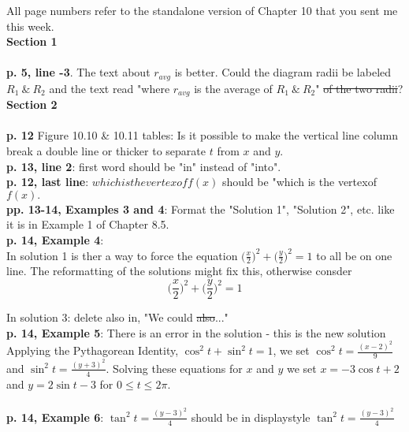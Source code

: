 \documentclass[11pt]{report}
\newcommand{\ds}{\displaystyle}
\begin{document}
All page numbers refer to the standalone version of Chapter 10 that you sent me this week.\\

\textbf{Section 1}\\ \\

\textbf{p. 5, line -3}. The text about $r_{avg}$ is better. Could the diagram radii be labeled $R_1 ~\&~ R_2$ and the text read "where $r_{avg}$ is the average of $R_1 ~\&~ R_2$" \sout{of the two radii}?\\


\textbf{Section 2}\\ \\

\textbf{p. 12}
Figure 10.10 \& 10.11 tables: Is it possible to make the vertical line column break a double line or thicker to separate $t$ from $x$ and $y$.\\

\textbf{p. 13, line 2}: first word should be "in" instead of "into".\\

\textbf{p. 12, last line}: $whichisthevertexoff(x)$ should be "which is the vertexof $f(x).$\\

\textbf{pp. 13-14, Examples 3 and 4}: Format the "Solution 1", "Solution 2", etc. like it is in Example 1 of Chapter 8.5.\\

\textbf{p. 14, Example 4}:\\
In solution 1 is ther a way to force the equation $\ds \biggl(\frac{x}{2}\biggr)^2+ \biggl(\frac{y}{2}\biggr)^2=1$ to all be on one line. The reformatting of the solutions might fix this, otherwise consder $$\biggl(\frac{x}{2}\biggr)^2+ \biggl(\frac{y}{2}\biggr)^2=1$$

In solution 3: delete also in, "We could \sout{also}..."\\

\textbf{p. 14, Example 5}: There is an error in the solution - this is the new solution\\
Applying the Pythagorean Identity, $\cos^2t+\sin^2t=1$, we set $\ds \cos^2 t =\frac{(x-2)^2}{9}$ and $\ds \sin^2 t=\frac{(y+3)^2}{4}$. Solving these equations for $x$ and $y$ we set $x=-3\cos t+2$ and $y=2\sin t-3$  for $0\leq t\leq 2\pi$.\\ \\

\textbf{p. 14, Example 6}: $\tan^2 t=\frac{(y-3)^2}{4}$ should be in displaystyle $\ds \tan^2 t=\frac{(y-3)^2}{4}$\\
\end{document}
